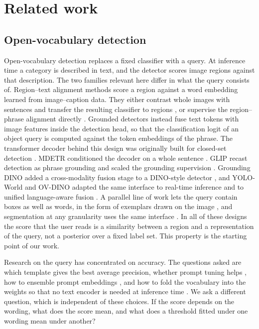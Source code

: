 \section{Related work}\label{sec:related}

\subsection{Open-vocabulary detection}

Open-vocabulary detection replaces a fixed classifier with a query. At inference time a
category is described in text, and the detector scores image regions against that
description. The two families relevant here differ in what the query consists of.
Region--text alignment methods score a region against a word embedding learned from
image--caption data. They either contrast whole images with sentences and transfer the
resulting classifier to regions \citep{radford2021learning}, or supervise the region--phrase
alignment directly \citep{zhong2022regionclip,yao2022detclip,minderer2023scaling}. Grounded
detectors instead fuse text tokens with image features inside the detection head, so that the
classification logit of an object query is computed against the token embeddings of the
phrase. The transformer decoder behind this design was originally built for closed-set
detection \citep{carion2020end}. MDETR conditioned the decoder on a whole sentence
\citep{kamath2021mdetr}. GLIP recast detection as phrase grounding and scaled the grounding
supervision \citep{li2022grounded}. Grounding DINO added a cross-modality fusion stage to a
DINO-style detector \citep{liu2024grounding}, and YOLO-World and OV-DINO adapted the same
interface to real-time inference and to unified language-aware fusion
\citep{cheng2024yolo,wang2024ovdino}. A parallel line of work lets the query contain boxes as
well as words, in the form of exemplars drawn on the image
\citep{xu2023multi,jiang2023trex,jiang2024trex2}, and segmentation at any granularity uses
the same interface \citep{li2024segment}. In all of these designs the score that the user
reads is a similarity between a region and a representation of the query, not a posterior
over a fixed label set. This property is the starting point of our work.

Research on the query has concentrated on accuracy. The questions asked are which template
gives the best average precision, whether prompt tuning helps \citep{zhou2022learning}, how to
ensemble prompt embeddings \citep{radford2021learning}, and how to fold the vocabulary into
the weights so that no text encoder is needed at inference time \citep{cheng2024yolo}. We ask
a different question, which is independent of these choices. If the score depends on the
wording, what does the score mean, and what does a threshold fitted under one wording mean
under another?

